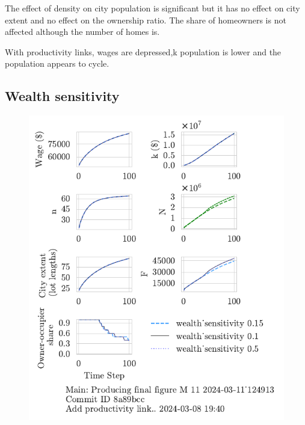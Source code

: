 The effect of density on city population is significant but it has no effect on city extent and no effect on the ownership ratio. The share of homeowners is not affected although the number of homes is. 

With productivity links, wages are depressed,k population is lower and the population appears to cycle.

\newpage %
\subsection{Wealth sensitivity}
\begin{figure}[h!tb] 
    \centering
    \includegraphics[scale=.75, trim={0 1.4cm 1.0cm 0},clip]{fig/wealth_sensitivity-124913.pdf} 

\end{figure}
